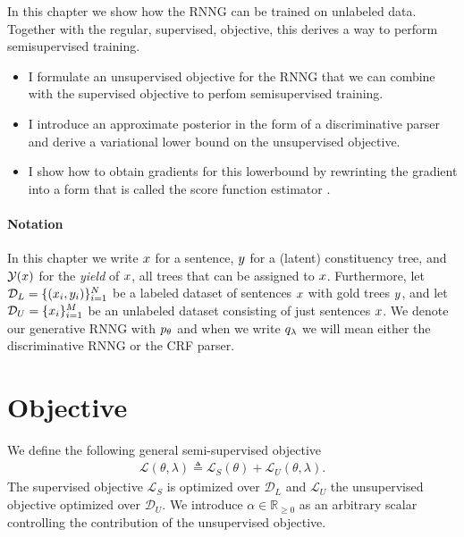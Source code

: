 

In this chapter we show how the RNNG can be trained on unlabeled data. Together with the regular, supervised, objective, this derives a way to perform semisupervised training.
\begin{itemize}
  \item I formulate an unsupervised objective for the RNNG that we can combine with the supervised objective to perfom semisupervised training.
  \item I introduce an approximate posterior in the form of a discriminative parser and derive a variational lower bound on the unsupervised objective.
  \item I show how to obtain gradients for this lowerbound by rewrinting the gradient into a form that is called the score function estimator \citep{Williams1992:REINFORCE,Fu2006}.
\end{itemize}

\paragraph{Notation} In this chapter we write $x$ for a sentence, $y$ for a (latent) constituency tree, and $\mathcal{Y}(x)$ for the \textit{yield} of $x$, all trees that can be assigned to $x$. Furthermore, let $\mathcal{D}_L = \{ (x_i, y_i)\}_{i=1}^N$ be a labeled dataset of sentences $x$ with gold trees $y$, and let $\mathcal{D}_U = \{ x_i \}_{i=1}^M$ be an unlabeled dataset consisting of just sentences $x$. We denote our generative RNNG with $p_{\theta}$ and when we write $q_{\lambda}$ we will mean either the discriminative RNNG or the CRF parser.

\section{Objective}
We define the following general semi-supervised objective
\begin{align*}
  \mathcal{L}(\theta, \lambda) \triangleq \mathcal{L}_{S}(\theta) + \mathcal{L}_{U}(\theta, \lambda).
\end{align*}
The supervised objective $\mathcal{L}_{S}$ is optimized over $\mathcal{D}_L$ and $\mathcal{L}_{U}$ the unsupervised objective optimized over $\mathcal{D}_U$. We introduce $\alpha \in \mathbb{R}_{\geq 0}$ as an arbitrary scalar controlling the contribution of the unsupervised objective.

